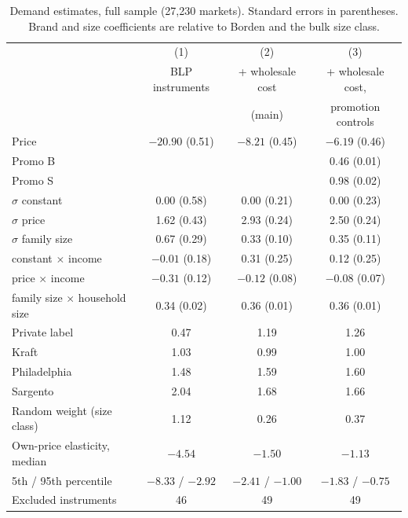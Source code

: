 \documentclass[11pt]{article}
\begin{document}
\begin{table}[h!]
\centering\small
\begin{tabular}{@{}lccc@{}}
\toprule
 & (1) & (2) & (3) \\
 & BLP instruments & + wholesale cost & + wholesale cost, \\
 &  & (main) & promotion controls \\
\midrule
Price                              & $-20.90$ (0.51) & $-8.21$ (0.45) & $-6.19$ (0.46) \\
Promo B                            &                 &                & 0.46 (0.01) \\
Promo S                            &                 &                & 0.98 (0.02) \\
\addlinespace
$\sigma$ constant                  & 0.00 (0.58)     & 0.00 (0.21)    & 0.00 (0.23) \\
$\sigma$ price                     & 1.62 (0.43)     & 2.93 (0.24)    & 2.50 (0.24) \\
$\sigma$ family size               & 0.67 (0.29)     & 0.33 (0.10)    & 0.35 (0.11) \\
constant $\times$ income           & $-0.01$ (0.18)  & 0.31 (0.25)    & 0.12 (0.25) \\
price $\times$ income              & $-0.31$ (0.12)  & $-0.12$ (0.08) & $-0.08$ (0.07) \\
family size $\times$ household size & 0.34 (0.02)    & 0.36 (0.01)    & 0.36 (0.01) \\
\addlinespace
Private label                      & 0.47            & 1.19           & 1.26 \\
Kraft                              & 1.03            & 0.99           & 1.00 \\
Philadelphia                       & 1.48            & 1.59           & 1.60 \\
Sargento                           & 2.04            & 1.68           & 1.66 \\
Random weight (size class)         & 1.12            & 0.26           & 0.37 \\
\addlinespace
Own-price elasticity, median       & $-4.54$         & $-1.50$        & $-1.13$ \\
5th / 95th percentile              & $-8.33$ / $-2.92$ & $-2.41$ / $-1.00$ & $-1.83$ / $-0.75$ \\
Excluded instruments               & 46              & 49             & 49 \\
\bottomrule
\end{tabular}
\caption{Demand estimates, full sample (27,230 markets). Standard errors in parentheses.
Brand and size coefficients are relative to Borden and the bulk size class.}\label{tab:demand}
\end{table}
\end{document}
